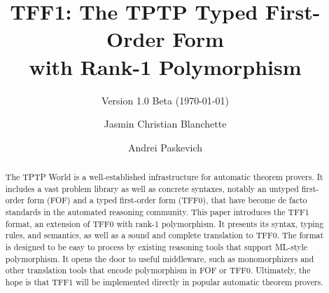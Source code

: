 \documentclass[a4paper]{llncs}
\begin{document}
\title{
TFF1: The TPTP Typed First-Order Form \\ with Rank-1
Polymorphism}
\subtitle{Version 1.0 Beta (\today)}

\author{
Jasmin Christian Blanchette \and
Andrei Paskevich
}


\maketitle

\begin{abstract}
The TPTP World is a well-established infrastructure for automatic theorem
provers. It includes a vast problem library as well as concrete syntaxes,
notably an untyped first-order form (FOF) and a typed first-order form (TFF0),
that have become de facto standards in the automated reasoning
community. This paper introduces the TFF1 format, an extension of TFF0 with
rank-1 polymorphism. It presents its syntax, typing rules, and semantics, as
well as a sound and complete translation to TFF0. The format is designed to be
easy to process by existing reasoning tools that support ML-style polymorphism.
It opens the door to useful middleware, such as monomorphizers and other
translation tools that encode polymorphism in FOF or TFF0. Ultimately, the hope
is that TFF1 will be implemented directly in popular automatic theorem provers.
\end{abstract}












\end{document}
